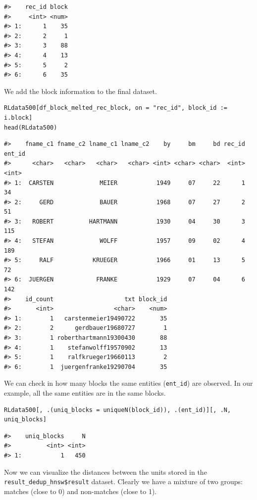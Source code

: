 \begin{verbatim}
#>    rec_id block
#>     <int> <num>
#> 1:      1    35
#> 2:      2     1
#> 3:      3    88
#> 4:      4    13
#> 5:      5     2
#> 6:      6    35
\end{verbatim}

We add the block information to the final dataset.

\begin{verbatim}
RLdata500[df_block_melted_rec_block, on = "rec_id", block_id := i.block]
head(RLdata500)
\end{verbatim}

\begin{verbatim}
#>    fname_c1 fname_c2 lname_c1 lname_c2    by     bm     bd rec_id ent_id
#>      <char>   <char>   <char>   <char> <int> <char> <char>  <int>  <int>
#> 1:  CARSTEN             MEIER           1949     07     22      1     34
#> 2:     GERD             BAUER           1968     07     27      2     51
#> 3:   ROBERT          HARTMANN           1930     04     30      3    115
#> 4:   STEFAN             WOLFF           1957     09     02      4    189
#> 5:     RALF           KRUEGER           1966     01     13      5     72
#> 6:  JUERGEN            FRANKE           1929     07     04      6    142
#>    id_count                    txt block_id
#>       <int>                 <char>    <num>
#> 1:        1   carstenmeier19490722       35
#> 2:        2      gerdbauer19680727        1
#> 3:        1 roberthartmann19300430       88
#> 4:        1    stefanwolff19570902       13
#> 5:        1    ralfkrueger19660113        2
#> 6:        1  juergenfranke19290704       35
\end{verbatim}

We can check in how many blocks the same entities (\texttt{ent\_id}) are observed. In our example, all the same entities are in the same blocks.

\begin{verbatim}
RLdata500[, .(uniq_blocks = uniqueN(block_id)), .(ent_id)][, .N, uniq_blocks]
\end{verbatim}

\begin{verbatim}
#>    uniq_blocks     N
#>          <int> <int>
#> 1:           1   450
\end{verbatim}

Now we can visualize the distances between the units stored in the \texttt{result\_dedup\_hnsw\$result} dataset. Clearly we have a mixture of two groups: matches (close to 0) and non-matches (close to 1).

